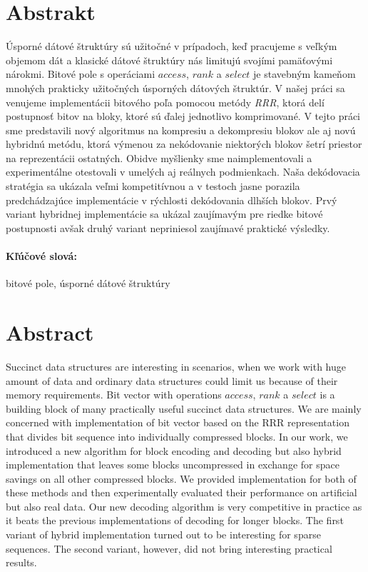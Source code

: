 \documentclass[12pt, twoside]{book}
\def\access{\mathit{access}}
\def\rank{\mathit{rank}}
\def\select{\mathit{select}}
\begin{document}
\section*{Abstrakt}  

Úsporné dátové štruktúry sú užitočné v prípadoch, keď pracujeme s veľkým
objemom dát a klasické dátové štruktúry nás limitujú svojími pamäťovými
nárokmi. Bitové pole s operáciami $\access$, $\rank$ a $\select$ je stavebným
kameňom mnohých prakticky užitočných úsporných dátových štruktúr. V našej práci
sa venujeme implementácii bitového poľa pomocou metódy \textit{RRR}, ktorá delí
postupnosť bitov na bloky, ktoré sú ďalej jednotlivo komprimované. V tejto práci
sme predstavili nový algoritmus na kompresiu a dekompresiu blokov ale aj novú
hybridnú metódu, ktorá výmenou za nekódovanie niektorých blokov šetrí priestor
na reprezentácii ostatných. Obidve myšlienky sme naimplementovali a experimentálne
otestovali v umelých aj reálnych podmienkach. Naša dekódovacia stratégia sa ukázala
veľmi kompetitívnou a v testoch jasne porazila predchádzajúce implementácie v
rýchlosti dekódovania dlhších blokov. Prvý variant hybridnej implementácie sa ukázal
zaujímavým pre riedke bitové postupnosti avšak druhý variant nepriniesol zaujímavé
praktické výsledky.

\paragraph*{Kľúčové slová:} bitové pole, úsporné dátové štruktúry


\newpage 
\section*{Abstract}

Succinct data structures are interesting in scenarios, when we work
with huge amount of data and ordinary data structures could limit us
because of their memory requirements. Bit vector with operations $\access$,
$\rank$ a $\select$ is a building block of many practically useful
succinct data structures. We are mainly concerned with implementation of
bit vector based on the RRR representation that divides bit sequence into
individually compressed blocks. In our work, we introduced a new algorithm
for block encoding and decoding but also hybrid implementation that leaves
some blocks uncompressed in exchange for space savings on all other compressed
blocks. We provided implementation for both of these methods and then experimentally
evaluated their performance on artificial but also real data. Our new decoding algorithm
is very competitive in practice as it beats the previous implementations of decoding
for longer blocks. The first variant of hybrid implementation turned out to be interesting
for sparse sequences. The second variant, however, did not bring interesting practical
results.
\end{document}
